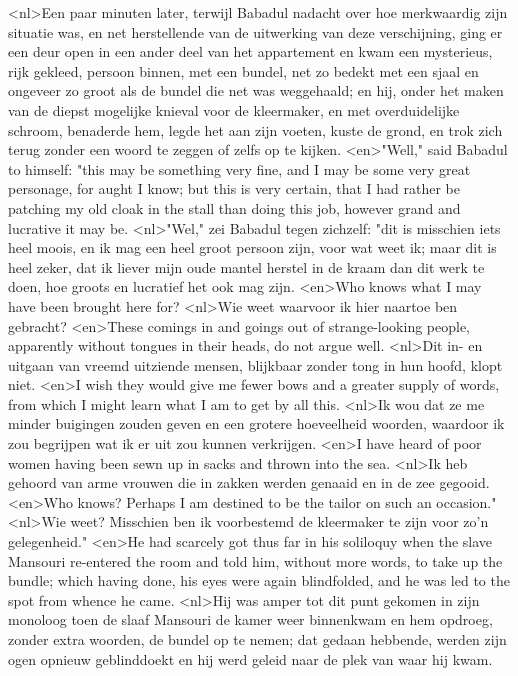 <nl>Een paar minuten later, terwijl Babadul nadacht over hoe merkwaardig zijn situatie was, en  net herstellende van de uitwerking van deze verschijning, ging er een deur open in een ander deel van het appartement en kwam een mysterieus, rijk gekleed, persoon binnen, met een bundel, net zo bedekt met een sjaal en ongeveer zo groot als de bundel die net was weggehaald; en hij, onder het maken van de diepst mogelijke knieval voor de kleermaker, en met overduidelijke schroom, benaderde hem, legde het aan zijn voeten, kuste de grond, en trok zich terug zonder een woord te zeggen of zelfs op te kijken.
<en>"Well," said Babadul to himself: "this may be something very fine, and I may be some very great personage, for aught I know; but this is very certain, that I had rather be patching my old cloak in the stall than doing this job, however grand and lucrative it may be.
<nl>"Wel," zei Babadul tegen zichzelf: "dit is misschien iets heel moois, en ik mag een heel groot persoon zijn, voor wat weet ik; maar dit is heel zeker, dat ik liever mijn oude mantel herstel in de kraam dan  dit werk te doen, hoe groots en lucratief het ook mag zijn.
<en>Who knows what I may have been brought here for?
<nl>Wie weet waarvoor ik hier naartoe ben gebracht?
<en>These comings in and goings out of strange-looking people, apparently without tongues in their heads, do not argue well.
<nl>Dit in- en uitgaan van vreemd uitziende mensen, blijkbaar zonder tong in hun hoofd, klopt niet.
<en>I wish they would give me fewer bows and a greater supply of words, from which I might learn what I am to get by all this.
<nl>Ik wou dat ze me minder buigingen zouden geven en een grotere hoeveelheid woorden, waardoor ik zou begrijpen wat ik er uit zou kunnen verkrijgen.
<en>I have heard of poor women having been sewn up in sacks and thrown into the sea.
<nl>Ik heb gehoord van arme vrouwen die in zakken werden genaaid en in de zee gegooid.
<en>Who knows? Perhaps I am destined to be the tailor on such an occasion."
<nl>Wie weet? Misschien ben ik voorbestemd  de kleermaker te zijn voor zo'n gelegenheid."
<en>He had scarcely got thus far in his soliloquy when the slave Mansouri re-entered the room and told him, without more words, to take up the bundle; which having done, his eyes were again blindfolded, and he was led to the spot from whence he came.
<nl>Hij was amper tot dit punt gekomen in zijn monoloog toen de slaaf Mansouri de kamer weer binnenkwam en hem opdroeg, zonder extra woorden, de bundel op te nemen; dat gedaan hebbende, werden zijn ogen opnieuw geblinddoekt en hij werd geleid naar de plek van waar hij kwam.
